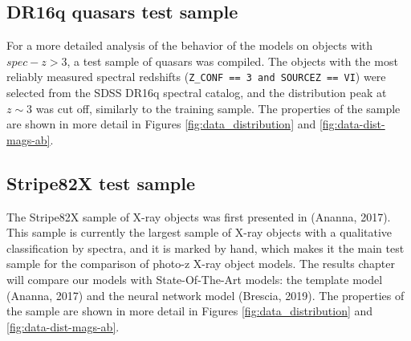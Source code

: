 \documentclass[fleqn,usenatbib]{mnras}
\begin{document}
\subsection{DR16q quasars test sample}
For a more detailed analysis of the behavior of the models on objects with $spec-z > 3$, a test sample of quasars was compiled. The objects with the most reliably measured spectral redshifts (\texttt{Z\_CONF == 3 and SOURCEZ == VI}) were selected from the SDSS DR16q spectral catalog, and the distribution peak at $z \sim 3$ was cut off, similarly to the training sample. The properties of the sample are shown in more detail in Figures \ref{fig:data_distribution} and \ref{fig:data-dist-mags-ab}.

\subsection{Stripe82X test sample}
The Stripe82X sample of X-ray objects was first presented in (Ananna, 2017). This sample is currently the largest sample of X-ray objects with a qualitative classification by spectra, and it is marked by hand, which makes it the main test sample for the comparison of photo-z X-ray object models. The results chapter will compare our models with State-Of-The-Art models: the template model (Ananna, 2017) and the neural network model (Brescia, 2019). The properties of the sample are shown in more detail in Figures \ref{fig:data_distribution} and \ref{fig:data-dist-mags-ab}.
\end{document}
